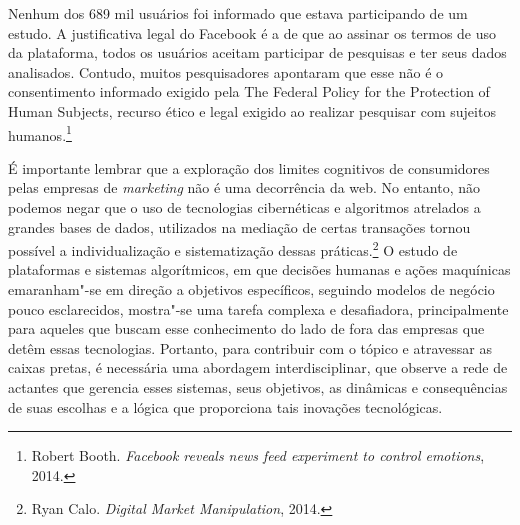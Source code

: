 Nenhum dos 689 mil usuários foi informado que estava participando de um
estudo. A justificativa legal do Facebook é a de que ao assinar os
termos de uso da plataforma, todos os usuários aceitam participar de
pesquisas e ter seus dados analisados. Contudo, muitos pesquisadores
apontaram que esse não é o consentimento informado exigido pela The
Federal Policy for the Protection of Human Subjects, recurso ético e
legal exigido ao realizar pesquisar com sujeitos humanos.\footnote{Robert Booth. \emph{Facebook reveals news feed experiment to control
emotions}, 2014.}

É importante lembrar que a exploração dos limites cognitivos de
consumidores pelas empresas de \emph{marketing} não é uma decorrência da web.
No entanto, não podemos negar que o uso de tecnologias cibernéticas e
algoritmos atrelados a grandes bases de dados, utilizados na mediação de
certas transações tornou possível a individualização e sistematização
dessas práticas.\footnote{Ryan Calo. \emph{Digital Market Manipulation}, 2014.} O estudo de plataformas e sistemas
algorítmicos, em que decisões humanas e ações maquínicas emaranham"-se em
direção a objetivos específicos, seguindo modelos de negócio pouco
esclarecidos, mostra"-se uma tarefa complexa e desafiadora,
principalmente para aqueles que buscam esse conhecimento do lado de fora
das empresas que detêm essas tecnologias. Portanto, para contribuir com
o tópico e atravessar as caixas pretas, é necessária uma abordagem
interdisciplinar, que observe a rede de actantes que gerencia esses
sistemas, seus objetivos, as dinâmicas e consequências de suas escolhas
e a lógica que proporciona tais inovações tecnológicas.


